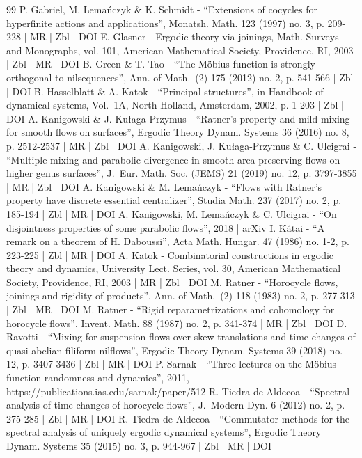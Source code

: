 \documentclass[10pt]{amsart}
\theoremstyle{definition}
\theoremstyle{plain}
\begin{document}
\begin{thebibliography}{99}
P. Gabriel, M. Lemańczyk \& K. Schmidt - “Extensions of cocycles for hyperfinite actions and applications”, Monatsh. Math. 123 (1997) no. 3, p. 209-228 | MR | Zbl | DOI
E. Glasner - Ergodic theory via joinings, Math. Surveys and Monographs, vol. 101, American Mathematical Society, Providence, RI, 2003 | Zbl | MR | DOI
B. Green \& T. Tao - “The Möbius function is strongly orthogonal to nilsequences”, Ann. of Math. (2) 175 (2012) no. 2, p. 541-566 | Zbl | DOI
B. Hasselblatt \& A. Katok - “Principal structures”, in Handbook of dynamical systems, Vol. 1A, North-Holland, Amsterdam, 2002, p. 1-203 | Zbl | DOI
A. Kanigowski \& J. Kułaga-Przymus - “Ratner’s property and mild mixing for smooth flows on surfaces”, Ergodic Theory Dynam. Systems 36 (2016) no. 8, p. 2512-2537 | MR | Zbl | DOI
A. Kanigowski, J. Kułaga-Przymus \& C. Ulcigrai - “Multiple mixing and parabolic divergence in smooth area-preserving flows on higher genus surfaces”, J. Eur. Math. Soc. (JEMS) 21 (2019) no. 12, p. 3797-3855 | MR | Zbl | DOI
A. Kanigowski \& M. Lemańczyk - “Flows with Ratner’s property have discrete essential centralizer”, Studia Math. 237 (2017) no. 2, p. 185-194 | Zbl | MR | DOI
A. Kanigowski, M. Lemańczyk \& C. Ulcigrai - “On disjointness properties of some parabolic flows”, 2018 | arXiv
I. Kátai - “A remark on a theorem of H. Daboussi”, Acta Math. Hungar. 47 (1986) no. 1-2, p. 223-225 | Zbl | MR | DOI
A. Katok - Combinatorial constructions in ergodic theory and dynamics, University Lect. Series, vol. 30, American Mathematical Society, Providence, RI, 2003 | MR | Zbl | DOI
M. Ratner - “Horocycle flows, joinings and rigidity of products”, Ann. of Math. (2) 118 (1983) no. 2, p. 277-313 | Zbl | MR | DOI
M. Ratner - “Rigid reparametrizations and cohomology for horocycle flows”, Invent. Math. 88 (1987) no. 2, p. 341-374 | MR | Zbl | DOI
D. Ravotti - “Mixing for suspension flows over skew-translations and time-changes of quasi-abelian filiform nilflows”, Ergodic Theory Dynam. Systems 39 (2018) no. 12, p. 3407-3436 | Zbl | MR | DOI
P. Sarnak - “Three lectures on the Möbius function randomness and dynamics”, 2011, https://publications.ias.edu/sarnak/paper/512
R. Tiedra de Aldecoa - “Spectral analysis of time changes of horocycle flows”, J. Modern Dyn. 6 (2012) no. 2, p. 275-285 | Zbl | MR | DOI
R. Tiedra de Aldecoa - “Commutator methods for the spectral analysis of uniquely ergodic dynamical systems”, Ergodic Theory Dynam. Systems 35 (2015) no. 3, p. 944-967 | Zbl | MR | DOI
\end{thebibliography}
\end{document}
